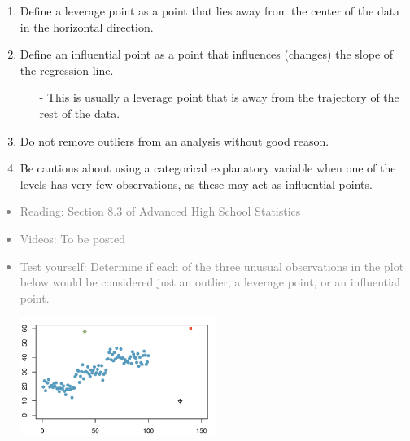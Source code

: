 \documentclass[11pt]{article}
\newcommand{\gray}[1]{\textcolor{gray}{#1}}
\begin{document}
%

\vspace{0.48cm}

%

\begin{enumerate}[resume]
\renewcommand\labelenumi{\textcolor{light}{\textbf{LO \theenumi.}}}

\item Define a leverage point as a point that lies away from the center of the data in the horizontal direction.

\item Define an influential point as a point that influences (changes) the slope of the regression line.
\begin{itemize}
\item[-] This is usually a leverage point that is away from the trajectory of the rest of the data.
\end{itemize}

\item Do not remove outliers from an analysis without good reason.

\item Be cautious about using a categorical explanatory variable when one of the levels has very few observations, as these may act as influential points.

\end{enumerate}

\gray{
{\it
\vspace{-0.55cm}
\begin{itemize}
\renewcommand{\labelitemi}{{\textcolor{dark}{$\ast$}}}
\item Reading: Section 8.3 of Advanced High School Statistics
\item Videos: To be posted 
\item Test yourself: Determine if each of the three unusual observations in the plot below would be considered just an outlier, a leverage point, or an influential point.
\begin{center}
\includegraphics[width=0.5\textwidth]{figures/outliers}
\end{center}
\end{itemize}
}}
\end{document}
